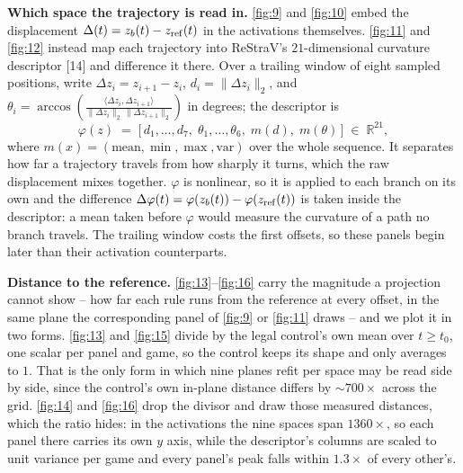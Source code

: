\documentclass{article}
\begin{document}
\textbf{Which space the trajectory is read in.} \cref{fig:9} and \cref{fig:10} embed the
displacement $\Delta(t) = z_b(t) - z_{\rm ref}(t)$ in the activations themselves. \cref{fig:11}
and \cref{fig:12} instead map each trajectory into ReStraV's $21$-dimensional curvature
descriptor [14] and difference it there. Over a trailing window of eight sampled positions, write
$\Delta z_i = z_{i+1} - z_i$, $d_i = \|\Delta z_i\|_2$, and
$\theta_i = \arccos\!\left(\frac{\langle \Delta z_i, \Delta z_{i+1}\rangle}{\|\Delta z_i\|_2\,
\|\Delta z_{i+1}\|_2}\right)$ in degrees; the descriptor is
\[
\varphi(z) \;=\; \big[\, d_1, \ldots, d_7,\; \theta_1, \ldots, \theta_6,\; m(d),\; m(\theta) \,\big]
\;\in\; \mathbb{R}^{21},
\]
where $m(x) = (\mathrm{mean}, \min, \max, \mathrm{var})$ over the whole sequence. It separates how
far a trajectory travels from how sharply it turns, which the raw displacement mixes together.
$\varphi$ is nonlinear, so it is applied to each branch on its own and the difference
$\Delta\varphi(t) = \varphi(z_b(t)) - \varphi(z_{\rm ref}(t))$ is taken inside the descriptor: a
mean taken before $\varphi$ would measure the curvature of a path no branch travels. The trailing
window costs the first offsets, so these panels begin later than their activation counterparts.

\textbf{Distance to the reference.} \cref{fig:13}--\cref{fig:16} carry the magnitude a projection
cannot show -- how far each rule runs from the reference at every offset, in the same plane the
corresponding panel of \cref{fig:9} or \cref{fig:11} draws -- and we plot it in two forms.
\cref{fig:13} and \cref{fig:15} divide by the legal control's own mean over $t \ge t_0$, one
scalar per panel and game, so the control keeps its shape and only averages to $1$. That is the
only form in which nine planes refit per space may be read side by side, since the control's own
in-plane distance differs by $\sim 700\times$ across the grid. \cref{fig:14} and
\cref{fig:16} drop the divisor and draw those measured distances, which the ratio hides: in the
activations the nine spaces span $1360\times$, so each panel there carries its own $y$ axis,
while the descriptor's columns are scaled to unit variance per game and every panel's peak falls
within $1.3\times$ of every other's.

  
\end{document}
